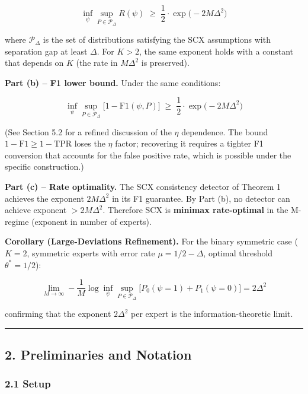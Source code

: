 \documentclass[
  12pt,
]{ctexart}
\begin{document}
\[\inf_{\psi} \sup_{P \in \mathcal{P}_{\Delta}} R(\psi) \;\geq\; \frac{1}{2} \cdot \exp\!\bigl(-2M\Delta^2\bigr)\]

where \(\mathcal{P}_{\Delta}\) is the set of distributions satisfying
the SCX assumptions with separation gap at least \(\Delta\). For
\(K > 2\), the same exponent holds with a constant that depends on \(K\)
(the rate in \(M\Delta^2\) is preserved).

\textbf{Part (b) -- F1 lower bound.} Under the same conditions:

\[\inf_{\psi} \sup_{P \in \mathcal{P}_{\Delta}} \bigl[1 - \text{F1}(\psi, P)\bigr] \;\geq\; \frac{1}{2} \cdot \exp\!\bigl(-2M\Delta^2\bigr)\]

(See Section 5.2 for a refined discussion of the \(\eta\) dependence.
The bound \(1-\text{F1} \geq 1-\text{TPR}\) loses the \(\eta\) factor;
recovering it requires a tighter F1 conversion that accounts for the
false positive rate, which is possible under the specific construction.)

\textbf{Part (c) -- Rate optimality.} The SCX consistency detector of
Theorem 1 achieves the exponent \(2M\Delta^2\) in its F1 guarantee. By
Part (b), no detector can achieve exponent \(> 2M\Delta^2\). Therefore
SCX is \textbf{minimax rate-optimal} in the M-regime (exponent in number
of experts).

\textbf{Corollary (Large-Deviations Refinement).} For the binary
symmetric case (\(K=2\), symmetric experts with error rate
\(\mu = 1/2 - \Delta\), optimal threshold \(\theta^* = 1/2\)):

\[\lim_{M \to \infty} -\frac{1}{M} \log \inf_{\psi} \sup_{P \in \mathcal{P}_{\Delta}} \bigl[P_0(\psi=1) + P_1(\psi=0)\bigr] = 2\Delta^2\]

confirming that the exponent \(2\Delta^2\) per expert is the
information-theoretic limit.

\begin{center}\rule{0.5\linewidth}{0.5pt}\end{center}

\subsection{2. Preliminaries and
Notation}\label{preliminaries-and-notation}

\subsubsection{2.1 Setup}\label{setup}
\end{document}
